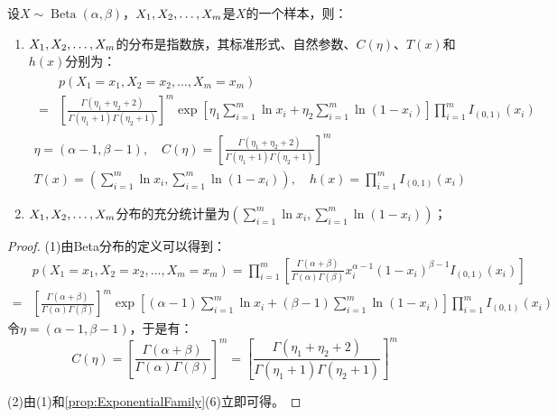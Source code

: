 \begin{theorem}
	设$X\sim\operatorname{Beta}(\alpha,\beta)$，$X_1, X_2, \dots, X_{m}$是$X$的一个样本，则：
	\begin{enumerate}
		\item $X_1, X_2, \dots, X_{m}$的分布是指数族，其标准形式、自然参数、$C(\eta)$、$T(x)$和$h(x)$分别为：
		\begin{gather*}
			\begin{aligned}
				&p(X_1=x_1,X_2=x_2,\dots,X_m=x_m) \\
				=&\left[\frac{\Gamma(\eta_1+\eta_2+2)}{\Gamma(\eta_1+1)\Gamma(\eta_2+1)}\right]^m\exp\left[\eta_1\sum_{i=1}^{m}\ln x_i+\eta_2\sum_{i=1}^{m}\ln(1-x_i)\right]\prod_{i=1}^{m}I_{(0,1)}(x_i)
			\end{aligned} \\
			\eta=(\alpha-1,\beta-1),\quad C(\eta)=\left[\frac{\Gamma(\eta_1+\eta_2+2)}{\Gamma(\eta_1+1)\Gamma(\eta_2+1)}\right]^m \\
			T(x)=\left(\sum_{i=1}^{m}\ln x_i,\sum_{i=1}^{m}\ln(1-x_i)\right),\quad h(x)=\prod_{i=1}^{m}I_{(0,1)}(x_i)
		\end{gather*}
		\item $X_1, X_2, \dots, X_{m}$分布的充分统计量为$\left(\sum\limits_{i=1}^{m}\ln x_i,\sum\limits_{i=1}^{m}\ln(1-x_i)\right)$；
	\end{enumerate}
\end{theorem}
\begin{proof}
	(1)由Beta分布的定义可以得到：
	\begin{align*}
		&p(X_1=x_1,X_2=x_2,\dots,X_m=x_m)=\prod_{i=1}^{m}\left[\frac{\Gamma(\alpha+\beta)}{\Gamma(\alpha)\Gamma(\beta)}x_i^{\alpha-1}(1-x_i)^{\beta-1}I_{(0,1)}(x_i)\right] \\
		=&\left[\frac{\Gamma(\alpha+\beta)}{\Gamma(\alpha)\Gamma(\beta)}\right]^m\exp\left[(\alpha-1)\sum_{i=1}^{m}\ln x_i+(\beta-1)\sum_{i=1}^{m}\ln(1-x_i)\right]\prod_{i=1}^{m}I_{(0,1)}(x_i)
	\end{align*}
	令$\eta=(\alpha-1,\beta-1)$，于是有：
	\begin{equation*}
		C(\eta)=\left[\frac{\Gamma(\alpha+\beta)}{\Gamma(\alpha)\Gamma(\beta)}\right]^m=\left[\frac{\Gamma(\eta_1+\eta_2+2)}{\Gamma(\eta_1+1)\Gamma(\eta_2+1)}\right]^m
	\end{equation*}\par
	(2)由(1)和\cref{prop:ExponentialFamily}(6)立即可得。
\end{proof}



